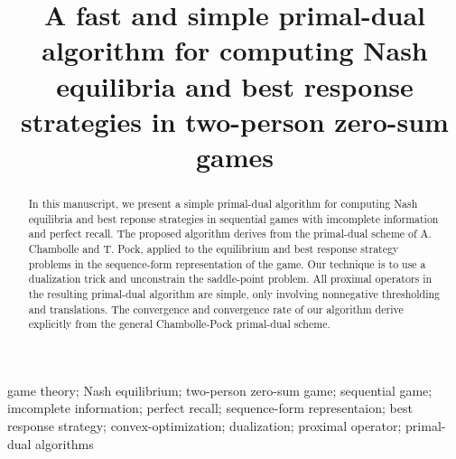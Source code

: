 \documentclass[a4paper,9pt,journal]{IEEEtran}
\begin{document}
\title{A fast and simple primal-dual algorithm for computing Nash equilibria and best response strategies in two-person zero-sum games}


\author{}


\maketitle

\begin{abstract}
% 
In this manuscript, we present a simple primal-dual algorithm for computing Nash equilibria and best reponse strategies in  sequential games with
imcomplete information and perfect recall. The proposed algorithm derives from the primal-dual scheme of A. Chambolle and T. Pock, applied to the
equilibrium and best response strategy problems in the sequence-form representation of the game. Our technique is to use a dualization
trick and unconstrain the saddle-point problem. All proximal operators in the resulting primal-dual algorithm are simple,
only involving nonnegative thresholding and translations.
The convergence and convergence rate of our algorithm derive explicitly from the general Chambolle-Pock primal-dual scheme.

\end{abstract}


\begin{IEEEkeywords}
  game theory; Nash equilibrium; two-person zero-sum game; sequential game; imcomplete information; perfect recall; sequence-form representaion;
  best response strategy; convex-optimization; dualization; proximal operator; primal-dual algorithms
\end{IEEEkeywords}
\end{document}
